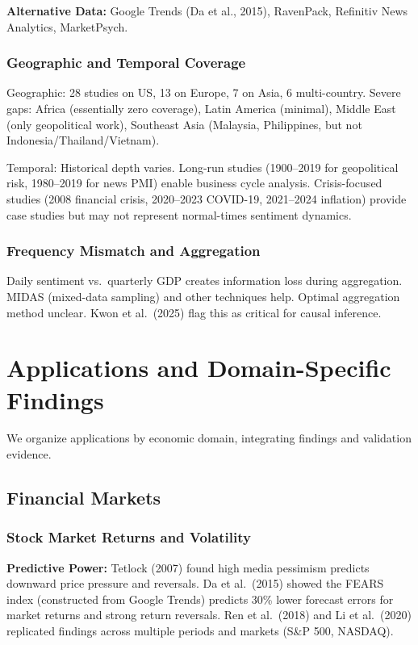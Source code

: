 \documentclass[12pt,a4paper]{article}
\begin{document}
\textbf{Alternative Data:} Google Trends (Da et al., 2015), RavenPack, Refinitiv News Analytics, MarketPsych.

\subsubsection{Geographic and Temporal Coverage}

Geographic: 28 studies on US, 13 on Europe, 7 on Asia, 6 multi-country. Severe gaps: Africa (essentially zero coverage), Latin America (minimal), Middle East (only geopolitical work), Southeast Asia (Malaysia, Philippines, but not Indonesia/Thailand/Vietnam).

Temporal: Historical depth varies. Long-run studies (1900--2019 for geopolitical risk, 1980--2019 for news PMI) enable business cycle analysis. Crisis-focused studies (2008 financial crisis, 2020--2023 COVID-19, 2021--2024 inflation) provide case studies but may not represent normal-times sentiment dynamics.

\subsubsection{Frequency Mismatch and Aggregation}

Daily sentiment vs.\ quarterly GDP creates information loss during aggregation. MIDAS (mixed-data sampling) and other techniques help. Optimal aggregation method unclear. Kwon et al.\ (2025) flag this as critical for causal inference.

\section{Applications and Domain-Specific Findings}
\label{sec:applications}

We organize applications by economic domain, integrating findings and validation evidence.

\subsection{Financial Markets}
\label{subsec:financial}

\subsubsection{Stock Market Returns and Volatility}

\textbf{Predictive Power:} Tetlock (2007) found high media pessimism predicts downward price pressure and reversals. Da et al.\ (2015) showed the FEARS index (constructed from Google Trends) predicts 30\% lower forecast errors for market returns and strong return reversals. Ren et al.\ (2018) and Li et al.\ (2020) replicated findings across multiple periods and markets (S\&P 500, NASDAQ).
\end{document}
